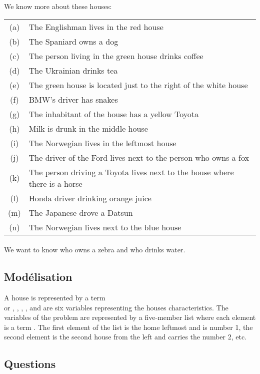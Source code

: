 \newpage

We know more about these houses:

\begin{tabular}{c@{ }l}
(a) & The Englishman lives in the red house \\
(b) & The Spaniard owns a dog \\
(c) & The person living in the green house drinks coffee \\
(d) & The Ukrainian drinks tea \\
(e) & The green house is located just to the right of the white house \\
(f) & BMW's driver has snakes \\
(g) & The inhabitant of the house has a yellow Toyota \\
(h) & Milk is drunk in the middle house \\
(i) & The Norwegian lives in the leftmost house \\
(j) & The driver of the Ford lives next to the person who owns a fox \\
(k) & The person driving a Toyota lives next to the house where there is a horse\\
(l) & Honda driver drinking orange juice \\
(m) & The Japanese drove a Datsun \\
(n) & The Norwegian lives next to the blue house
\end{tabular}
\paragraph{}
We want to know who owns a zebra and who drinks water.

\subsection{Modélisation}

A house is represented by a term
\\ or
, , , ,
 and  are six variables representing the houses characteristics. The variables of the problem are
represented by a five-member list where each element is a
term . The first element of the list is the
home leftmost and is number 1, the second element
is the second house from the left and carries the
number 2, etc.

\subsection{Questions}


